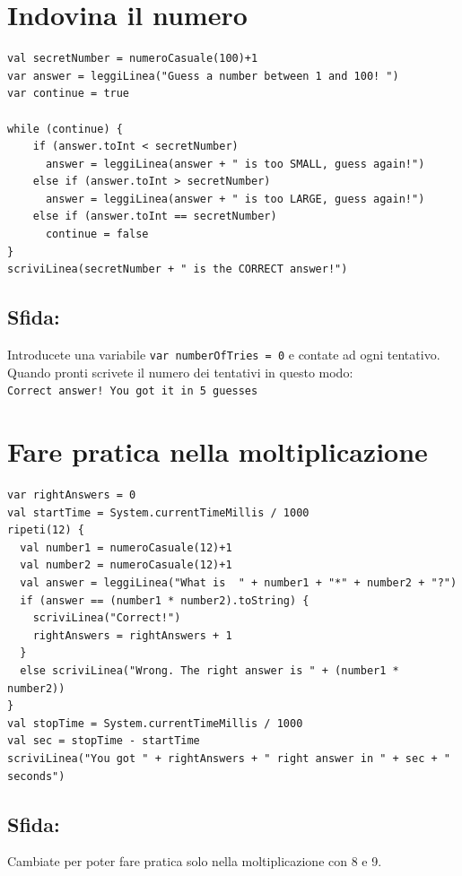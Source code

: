 \chapter{Indovina il numero}
\begin{lstlisting}[basicstyle={\ttfamily\fontsize{16}{19}\selectfont},numbers=none]
val secretNumber = numeroCasuale(100)+1
var answer = leggiLinea("Guess a number between 1 and 100! ")
var continue = true

while (continue) {
    if (answer.toInt < secretNumber)
      answer = leggiLinea(answer + " is too SMALL, guess again!")
    else if (answer.toInt > secretNumber)
      answer = leggiLinea(answer + " is too LARGE, guess again!")
    else if (answer.toInt == secretNumber)
      continue = false
}
scriviLinea(secretNumber + " is the CORRECT answer!")
\end{lstlisting}
        
\section*{\color{BrickRed}Sfida:}
Introducete una variabile \lstinline{var numberOfTries = 0} e contate ad ogni tentativo.\\
Quando pronti scrivete il numero dei tentativi in questo modo:\\
\lstinline{Correct answer! You got it in 5 guesses}
\chapter{Fare pratica nella moltiplicazione}
\begin{lstlisting}[basicstyle={\ttfamily\fontsize{16}{19}\selectfont},numbers=none]
var rightAnswers = 0
val startTime = System.currentTimeMillis / 1000
ripeti(12) {
  val number1 = numeroCasuale(12)+1
  val number2 = numeroCasuale(12)+1
  val answer = leggiLinea("What is  " + number1 + "*" + number2 + "?")
  if (answer == (number1 * number2).toString) {
    scriviLinea("Correct!")
    rightAnswers = rightAnswers + 1
  }
  else scriviLinea("Wrong. The right answer is " + (number1 * number2))
}
val stopTime = System.currentTimeMillis / 1000
val sec = stopTime - startTime
scriviLinea("You got " + rightAnswers + " right answer in " + sec + " seconds")
\end{lstlisting}
        
\section*{\color{BrickRed}Sfida:}
Cambiate per poter fare pratica solo nella moltiplicazione con 8 e 9.
